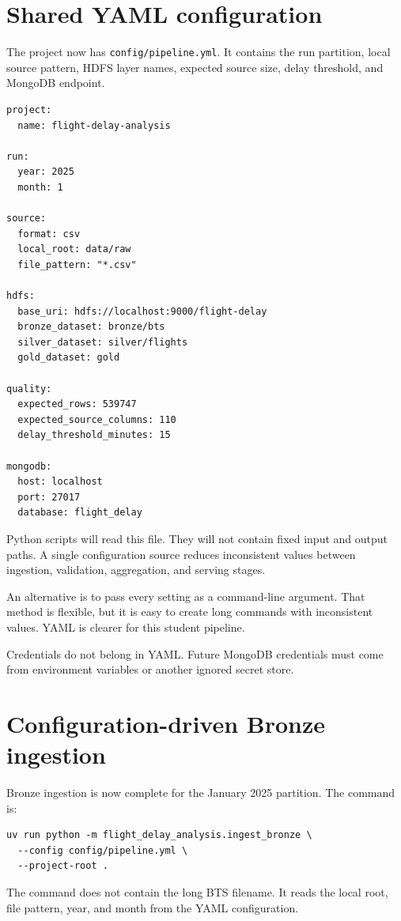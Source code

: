\documentclass[11pt,a4paper]{article}
\begin{document}
\section{Shared YAML configuration}

The project now has \texttt{config/pipeline.yml}. It contains the run partition, local source pattern, HDFS layer names, expected source size, delay threshold, and MongoDB endpoint.

\begin{lstlisting}
project:
  name: flight-delay-analysis

run:
  year: 2025
  month: 1

source:
  format: csv
  local_root: data/raw
  file_pattern: "*.csv"

hdfs:
  base_uri: hdfs://localhost:9000/flight-delay
  bronze_dataset: bronze/bts
  silver_dataset: silver/flights
  gold_dataset: gold

quality:
  expected_rows: 539747
  expected_source_columns: 110
  delay_threshold_minutes: 15

mongodb:
  host: localhost
  port: 27017
  database: flight_delay
\end{lstlisting}

Python scripts will read this file. They will not contain fixed input and output paths. A single configuration source reduces inconsistent values between ingestion, validation, aggregation, and serving stages.

An alternative is to pass every setting as a command-line argument. That method is flexible, but it is easy to create long commands with inconsistent values. YAML is clearer for this student pipeline.

Credentials do not belong in YAML. Future MongoDB credentials must come from environment variables or another ignored secret store.

\section{Configuration-driven Bronze ingestion}

Bronze ingestion is now complete for the January 2025 partition. The command is:

\begin{lstlisting}
uv run python -m flight_delay_analysis.ingest_bronze \
  --config config/pipeline.yml \
  --project-root .
\end{lstlisting}

The command does not contain the long BTS filename. It reads the local root, file pattern, year, and month from the YAML configuration.
\end{document}
